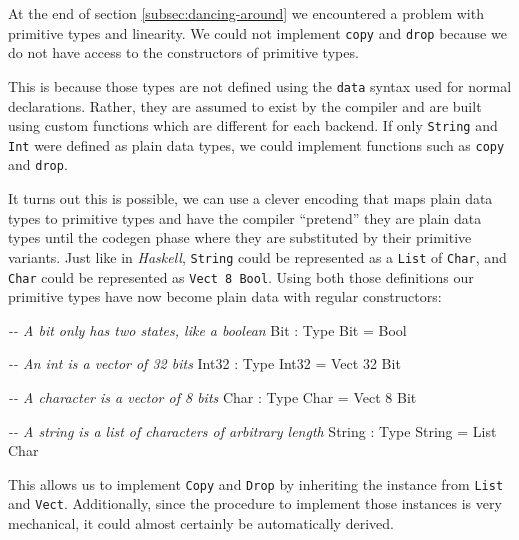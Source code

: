 \documentclass[
]{article}
\newenvironment{Shaded}{}{}
\newcommand{\CommentTok}[1]{\textcolor[rgb]{0.38,0.63,0.69}{\textit{#1}}}
\newcommand{\DataTypeTok}[1]{\textcolor[rgb]{0.56,0.13,0.00}{#1}}
\newcommand{\DecValTok}[1]{\textcolor[rgb]{0.25,0.63,0.44}{#1}}
\newcommand{\OperatorTok}[1]{\textcolor[rgb]{0.40,0.40,0.40}{#1}}
\newcommand{\OtherTok}[1]{\textcolor[rgb]{0.00,0.44,0.13}{#1}}
\begin{document}
\label{subsec:mapping-primitives}

At the end of section \ref{subsec:dancing-around} we encountered a
problem with primitive types and linearity. We could not implement
\texttt{copy} and \texttt{drop} because we do not have access to the
constructors of primitive types.

This is because those types are not defined using the \texttt{data}
syntax used for normal declarations. Rather, they are assumed to exist
by the compiler and are built using custom functions which are different
for each backend. If only \texttt{String} and \texttt{Int} were defined
as plain data types, we could implement functions such as \texttt{copy}
and \texttt{drop}.

It turns out this is possible, we can use a clever encoding that maps
plain data types to primitive types and have the compiler ``pretend''
they are plain data types until the codegen phase where they are
substituted by their primitive variants. Just like in \emph{Haskell},
\texttt{String} could be represented as a \texttt{List} of
\texttt{Char}, and \texttt{Char} could be represented as
\texttt{Vect\ 8\ Bool}. Using both those definitions our primitive types
have now become plain data with regular constructors:

\begin{Shaded}
\begin{Highlighting}[]
\CommentTok{{-}{-} A bit only has two states, like a boolean}
\DataTypeTok{Bit} \OperatorTok{:} \DataTypeTok{Type}
\DataTypeTok{Bit} \OtherTok{=} \DataTypeTok{Bool}

\CommentTok{{-}{-} An int is a vector of 32 bits}
\DataTypeTok{Int32} \OperatorTok{:} \DataTypeTok{Type}
\DataTypeTok{Int32} \OtherTok{=} \DataTypeTok{Vect} \DecValTok{32} \DataTypeTok{Bit}

\CommentTok{{-}{-} A character is a vector of 8 bits}
\DataTypeTok{Char} \OperatorTok{:} \DataTypeTok{Type}
\DataTypeTok{Char} \OtherTok{=} \DataTypeTok{Vect} \DecValTok{8} \DataTypeTok{Bit}

\CommentTok{{-}{-} A string is a list of characters of arbitrary length}
\DataTypeTok{String} \OperatorTok{:} \DataTypeTok{Type}
\DataTypeTok{String} \OtherTok{=} \DataTypeTok{List} \DataTypeTok{Char}
\end{Highlighting}
\end{Shaded}

This allows us to implement \texttt{Copy} and \texttt{Drop} by
inheriting the instance from \texttt{List} and \texttt{Vect}.
Additionally, since the procedure to implement those instances is very
mechanical, it could almost certainly be automatically derived.
\end{document}
